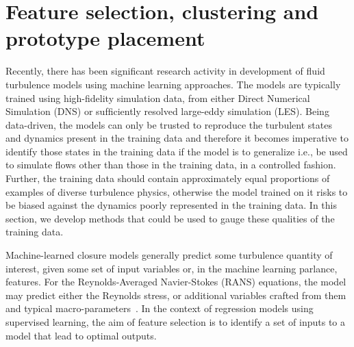 \section{Feature selection, clustering and prototype placement}
\label{sec:feature_cluster_prototype}

Recently, there has been signiﬁcant research activity in development of ﬂuid turbulence models using
machine learning approaches. The models are typically trained using high-ﬁdelity simulation data, from
either Direct Numerical Simulation (DNS) or sufﬁciently resolved large-eddy simulation (LES). Being
data-driven, the models can only be trusted to reproduce the turbulent states and dynamics present in the
training data and therefore it becomes imperative to identify those states in the training data if the model is to generalize i.e., be used to simulate ﬂows other than those in the training data, in a controlled fashion. Further, the training data should contain approximately equal proportions of examples of diverse turbulence physics, otherwise the model trained on it risks to be biased against the dynamics poorly represented in the training data. In this section, we develop methods that could be used to gauge these qualities of the training data.

Machine-learned closure models generally predict some turbulence quantity of interest, given some set of
input variables or, in the machine learning parlance, features. For the Reynolds-Averaged Navier-Stokes
(RANS) equations, the model may predict either the Reynolds stress, or additional variables crafted from them and typical macro-parameters~\cite{Wu2018,Xiao2016,zhu2022generalization,yin2020feature}. In the context of regression models using supervised learning, the aim of feature selection is to identify a set of inputs to a model that lead to optimal outputs. %

